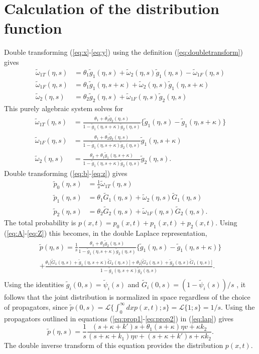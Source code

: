 \documentclass[]{agujournal2018}
\newcommand\be{\begin{equation}}
\newcommand\ee{\end{equation}}
\newcommand\tom{\tilde{\omega}}
\newcommand\tg{\tilde{g}}
\newcommand\tp{\tilde{p}}
\newcommand\tG{\tilde{G}}
\begin{document}
\section{Calculation of the distribution function}
\label{sec:appendixA}
Double transforming (\ref{eq:x}-\ref{eq:y}) using the definition (\ref{eq:doubletransform}) gives
\begin{align}
\tom_{1T}(\eta,s) &= \theta_1 \tg_1(\eta,s) + \tom_2(\eta,s)\tg_1(\eta,s)-\tom_{1F}(\eta,s)\\
\tom_{1F}(\eta,s) &= \theta_1\tg_1(\eta,s+\kappa) + \tom_2(\eta,s)\tg_1(\eta,s+\kappa)\\
\tom_2(\eta,s) &= \theta_2 \tg_2(\eta,s) + \tom_{1F}(\eta,s)\tg_2(\eta,s)
\end{align}
This purely algebraic system solves for 
\begin{align}
\tom_{1T}(\eta,s) &= \frac{\theta_1 + \theta_2 \tg_2(\eta,s)}{1-\tg_1(\eta,s+\kappa)\tg_2(\eta,s)}\big\{\tg_1(\eta,s)-\tg_1(\eta,s+\kappa) \big\} \label{eq:A} \\
\tom_{1F}(\eta,s) &= \frac{\theta_1 + \theta_2 \tg_2(\eta,s)}{1-\tg_1(\eta,s+\kappa)\tg_2(\eta,s)}\tg_1(\eta,s+\kappa)\\
\tom_{2}(\eta,s) &= \frac{\theta_2 + \theta_1 \tg_1(\eta,s+\kappa)}{1-\tg_1(\eta,s+\kappa)\tg_2(\eta,s)}\tg_2(\eta,s). 
\end{align}
Double transforming (\ref{eq:b}-\ref{eq:z}) gives
\begin{align}
\tp_0(\eta,s) &= \frac{1}{s}\tom_{1T}(\eta,s)\\
\tp_1(\eta,s) &= \theta_1 \tG_1(\eta,s) + \tom_2(\eta,s) \tG_1(\eta,s) \\
\tp_2(\eta,s) &= \theta_2 \tG_2(\eta,s) + \tom_{1F}(\eta,s)\tG_2(\eta,s).\label{eq:Z}
\end{align}
The total probability is $p(x,t) = p_0(x,t) + p_1(x,t) + p_2(x,t)$. Using (\ref{eq:A}-\ref{eq:Z}) this becomes, in the double Laplace representation, 
\begin{multline}
\tp(\eta,s) = \frac{1}{s}\frac{\theta_1 + \theta_2 \tg_2(\eta,s)}{1-\tg_1(\eta,s+\kappa)\tg_2(\eta,s)}\big\{\tg_1(\eta,s)-\tg_1(\eta,s+\kappa) \big\} \\
+\frac{\theta_1\big[\tG_1(\eta,s) + \tg_1(\eta,s+\kappa)\tG_2(\eta,s)\big]+ \theta_2\big[\tG_2(\eta,s) + \tg_2(\eta,s)\tG_1(\eta,s)\big]}{1-\tg_1(\eta,s+\kappa)\tg_2(\eta,s)}. \\
\label{eq:lap}
\end{multline}
Using the identities $\tg_i(0,s) = \tilde{\psi}_i(s)$ and $\tG_i(0,s) = (1-\tilde{\psi}_i(s))/s$ \citep[e.g.][]{Weiss1994}, it follows that the joint distribution is normalized in space regardless of the choice of propagators, since $\tp(0,s) = \mathcal{L}\{\int_0^\infty dx p(x,t);s\} = \mathcal{L}\{1;s\} = 1/s$.
Using the propagators outlined in equations (\ref{eq:prop1}-\ref{eq:prop2}) in (\ref{eq:lap}) gives 
\be \tilde{p}(\eta,s) = \frac{1}{s}\frac{(s+\kappa + k')s  + \theta_1(s+\kappa )\eta v+ \kappa k_2}{(s+\kappa+k_1)\eta v+(s+\kappa+k')s + \kappa k_2}.\label{eq:nicedist}\ee
The double inverse transform of this equation provides the distribution $p(x,t)$.
\end{document}
